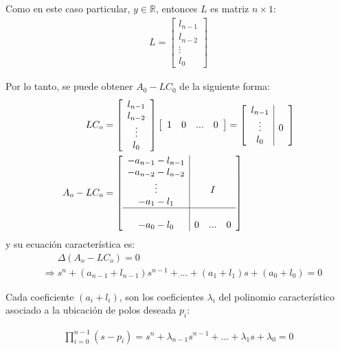 Como en este caso particular, $y\in\mathbb{R}$, entonces $L$ es matriz $n \times 1$:
\begin{align*}
    L=\left[
    \begin{array}{c}
     l_{n-1} \\ l_{n-2}\\ \vdots\\ l_0 
    \end{array}\right] 
\end{align*}

Por lo tanto, se puede obtener $A_0 - LC_0$ de la siguiente forma:
\begin{align*}
    LC_o&=\left[
    \begin{array}{c}
     l_{n-1} \\ l_{n-2}\\ \vdots\\ l_0 
    \end{array}\right] \left[
    \begin{array}{c c c c}
     1 & 0 & ... & 0
    \end{array}\right] =\left[
    \begin{array}{c|c}
     l_{n-1} & \\ \vdots & {0} \\ l_0 & 
    \end{array}\right] \\
    A_o-LC_o &= \left[ \begin{array}{c|c c c}
     -a_{n-1}-l_{n-1} & & & \\  -a_{n-2}-l_{n-2} & & & \\ \vdots & & {I} & \\-a_1-l_1 & & & \\ \hline \\ -a_0-l_0 & 0 & ... & 0
    \end{array}\right] 
\end{align*}
y su ecuación característica es: 
\begin{align*}
    &\phantom{\Longrightarrow} \Delta(A_o-LC_o) = 0 \\
    &\Longrightarrow s^n+(a_{n-1}+l_{n-1})s^{n-1}+...+(a_1+l_1)s+(a_0+l_0) = 0
\end{align*}

Cada coeficiente $(a_i+l_i)$, son los coeficientes $\lambda_i$ del polinomio característico asociado a la ubicación de polos deseada $p_i$:

\begin{align*}
    \prod_{i=0}^{n-1}(s-p_i)=s^n+\lambda_{n-1}s^{n-1}+...+\lambda_1s+\lambda_0=0
\end{align*}

